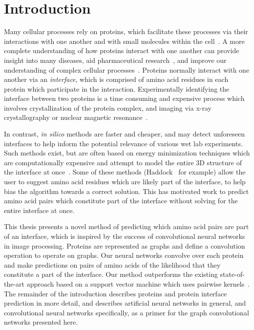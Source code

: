 

\chapter{Introduction}
\label{chap:intro}

Many cellular processes rely on proteins, which facilitate these processes via their interactions with one another and with small molecules within the cell~\cite{scheeffink2003}.
A more complete understanding of how proteins interact with one another can provide insight into many diseases, aid pharmaceutical research~\cite{fauman2003}, and improve our understanding of complex cellular processes~\cite{altman2003}.
Proteins normally interact with one another via an \textit{interface}, which is comprised of amino acid residues in each protein which participate in the interaction.
Experimentally identifying the interface between two proteins is a time consuming and expensive process which involves crystallization of the protein complex, and imaging via x-ray crystallography or nuclear magnetic resonance~\cite{bijelic2017}\cite{ilarisavino2017}\cite{wang2017}.

In contrast, \textit{in silico} methods are faster and cheaper, and may detect unforeseen interfaces to help inform the potential relevance of various wet lab experiments.
Such methods exist, but are often based on energy minimization techniques which are computationally expensive and attempt to model the entire 3D structure of the interface at once~\cite{esmaielbeiki2015}.
Some of these methods (Haddock~\cite{zundert2016} for example) allow the user to suggest amino acid residues which are likely part of the interface, to help bias the algorithm towards a correct solution.
This has motivated work to predict amino acid pairs which constitute part of the interface without solving for the entire interface at once. 

This thesis presents a novel method of predicting which amino acid pairs are part of an interface, which is inspired by the success of convolutional neural networks in image processing. 
Proteins are represented as graphs and define a convolution operation to operate on graphs.
Our neural networks convolve over each protein and make predictions on pairs of amino acids of the likelihood that they constitute a part of the interface. 
Our method outperforms the existing state-of-the-art approach based on a support vector machine which uses pairwise kernels~\cite{minhas2014}.
The remainder of the introduction describes proteins and protein interface prediction in more detail, and describes artificial neural networks in general, and convolutional neural networks specifically, as a primer for the graph convolutional networks presented here.

